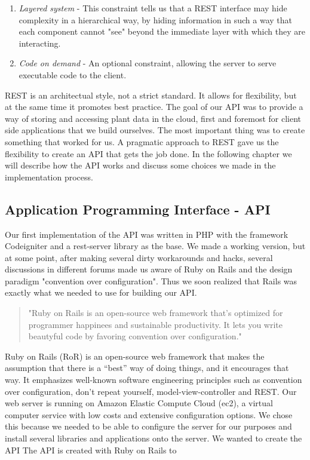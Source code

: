 \begin{enumerate}
\item{} \emph{Layered system} - This constraint tells us that a REST interface may hide complexity in a hierarchical way, by hiding information in such a way that each component cannot "see" beyond the immediate layer with which they are interacting. \citep{fielding2000architectural}

\item{} \emph{Code on demand} - An optional constraint, allowing the server to serve executable code to the client. 

\end{enumerate}

REST is an architectual style, not a strict standard. It allows for flexibility, but at the same time it promotes best practice. The goal of our API was to provide a way of storing and accessing plant data in the cloud, first and foremost for client side applications that we build ourselves. The most important thing was to create something that worked for us. A pragmatic approach to REST gave us the flexibility to create an API that gets the job done. In the following chapter we will describe how the API works and discuss some choices we made in the implementation process.

\subsection{Application Programming Interface - API}
Our first implementation of the API was written in PHP with the framework Codeigniter and a rest-server library as the base. We made a working version, but at some point, after making several dirty workarounds and hacks, several discussions in different forums made us aware of Ruby on Rails and the design paradigm "convention over configuration". Thus we soon realized that Rails was exactly what we needed to use for building our API.

\begin{quote}
"Ruby on Rails is an open-source web framework that’s optimized for programmer happinees and sustainable productivity. It lets you write beautyful code by favoring convention over configuration."\citep{rubyonrails.org} 
\end{quote}

Ruby on Rails (RoR) is an open-source web framework that makes the assumption that there is a “best” way of doing things, and it encourages that way. It emphasizes well-known software engineering principles such as convention over configuration, don't repeat yourself, model-view-controller and REST.
 Our web server is running on Amazon Elastic Compute Cloud (ec2), a virtual computer service with low costs and extensive configuration options. We chose this because we needed to be able to configure the server for our purposes and install several libraries and applications onto the server. We wanted to create the API The API is created with Ruby on Rails to 


